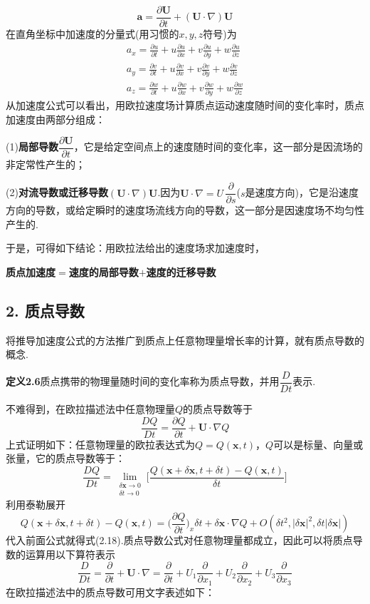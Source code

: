 \begin{equation*}
\boldsymbol{a}=\frac{\partial\boldsymbol{U}}{\partial t}+(\boldsymbol{U}\cdot\nabla)\boldsymbol{U}
\tag{2.16}
\end{equation*}
在直角坐标中加速度的分量式(用习惯的$x,y,z$符号)为
\begin{gather*}
a_x=\frac{\partial u}{\partial t}+u\frac{\partial u}{\partial x}+v\frac{\partial u}{\partial y}+w\frac{\partial u}{\partial z}\tag{2.17a}\\[2pt]
a_y=\frac{\partial v}{\partial t}+u\frac{\partial v}{\partial x}+v\frac{\partial v}{\partial y}+w\frac{\partial v}{\partial z}\tag{2.17b}\\[2pt]
a_z=\frac{\partial w}{\partial t}+u\frac{\partial w}{\partial x}+v\frac{\partial w}{\partial y}+w\frac{\partial w}{\partial z}\tag{2.17c}
\end{gather*}
从加速度公式可以看出，用欧拉速度场计算质点运动速度随时间的变化率时，质点加速度由两部分组成：

(1)\textbf{局部导数}$\dfrac{\partial\boldsymbol{U}}{\partial t}$，它是给定空间点上的速度随时间的变化率，这一部分是因流场的非定常性产生的；

(2)\textbf{对流导数或迁移导数}$(\boldsymbol{U}\cdot\nabla)\boldsymbol{U}$.因为$\boldsymbol{U}\cdot\nabla=U\,\dfrac{\partial}{\partial s}$($s$是速度方向)，它是沿速度方向的导数，或给定瞬时的速度场流线方向的导数，这一部分是因速度场不均匀性产生的.

于是，可得如下结论：用欧拉法给出的速度场求加速度时，

\textbf{质点加速度$=$速度的局部导数$+$速度的迁移导数}

\subsection*{2. 质点导数}

将推导加速度公式的方法推广到质点上任意物理量增长率的计算，就有质点导数的概念.

\noindent\textbf{定义2.6}\quad 质点携带的物理量随时间的变化率称为质点导数，并用$\dfrac{D}{Dt}$表示.

不难得到，在欧拉描述法中任意物理量$Q$的质点导数等于
\begin{equation*}
\frac{DQ}{Dt}=\frac{\partial Q}{\partial t}+\boldsymbol{U}\cdot\nabla Q
\tag{2.18}
\end{equation*}
上式证明如下：任意物理量的欧拉表达式为$Q=Q(\boldsymbol{x},t)$，$Q$可以是标量、向量或张量，它的质点导数等于：
\[
\frac{DQ}{Dt}=\lim_{\substack{\delta\boldsymbol{x}\to 0\\ \delta t\to 0}}\bigg[\frac{Q(\boldsymbol{x}+\delta\boldsymbol{x},t+\delta t)-Q(\boldsymbol{x},t)}{\delta t}\bigg]
\]
利用泰勒展开
\[
Q(\boldsymbol{x}+\delta\boldsymbol{x},t+\delta t)-Q(\boldsymbol{x},t)=\Big(\frac{\partial Q}{\partial t}\Big)_{\!x}\delta t+\delta\boldsymbol{x}\cdot\nabla Q+O(\delta t^{2},|\delta\boldsymbol{x}|^{2},\delta t|\delta\boldsymbol{x}|)
\]
代入前面公式就得式(2.18).质点导数公式对任意物理量都成立，因此可以将质点导数的运算用以下算符表示
\[
\frac{D}{Dt}=\frac{\partial}{\partial t}+\boldsymbol{U}\cdot\nabla=\frac{\partial}{\partial t}+U_1\frac{\partial}{\partial x_1}+U_2\frac{\partial}{\partial x_2}+U_3\frac{\partial}{\partial x_3}
\]
在欧拉描述法中的质点导数可用文字表述如下：

